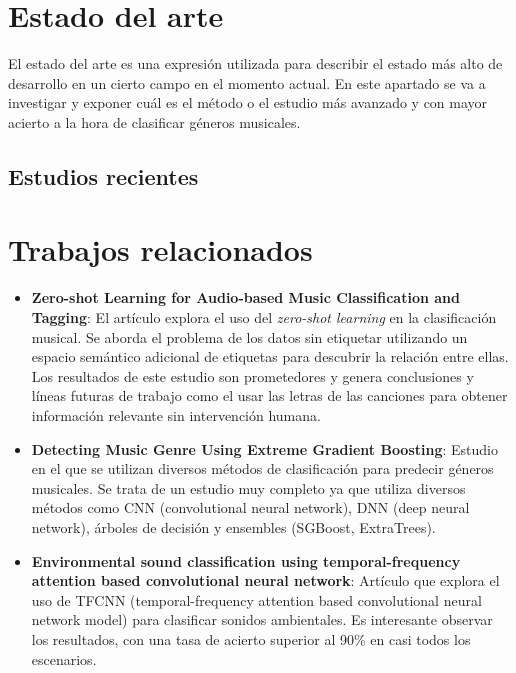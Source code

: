 
\section{Estado del arte}

El estado del arte es una expresión utilizada para describir el estado más alto de desarrollo en un cierto campo en el momento actual. 
En este apartado se va a investigar y exponer cuál es el método o el estudio más avanzado y con mayor acierto a la hora de clasificar géneros musicales.

\subsection{Estudios recientes}



\section{Trabajos relacionados}

\begin{itemize}
\tightlist

\item \textbf{Zero-shot Learning for Audio-based Music Classification and Tagging}: El artículo explora el uso del \textit{zero-shot learning} en la clasificación musical. 
Se aborda el problema de los datos sin etiquetar utilizando un espacio semántico adicional de etiquetas para descubrir la relación entre ellas. 
Los resultados de este estudio son prometedores y genera conclusiones y líneas futuras de trabajo como el usar las letras de las canciones para obtener información relevante sin intervención humana.

\item \textbf{Detecting Music Genre Using Extreme Gradient Boosting}: Estudio en el que se utilizan diversos métodos de clasificación para predecir géneros musicales. Se trata de un estudio muy completo ya
que utiliza diversos métodos como CNN (convolutional neural network), DNN (deep neural network), árboles de decisión y ensembles (SGBoost, ExtraTrees).

\item \textbf{Environmental sound classification using temporal-frequency attention based convolutional neural network}: Artículo que explora el uso de TFCNN (temporal-frequency attention based convolutional neural network model)
para clasificar sonidos ambientales. Es interesante observar los resultados, con una tasa de acierto superior al 90\% en casi todos los escenarios.
\end{itemize}
